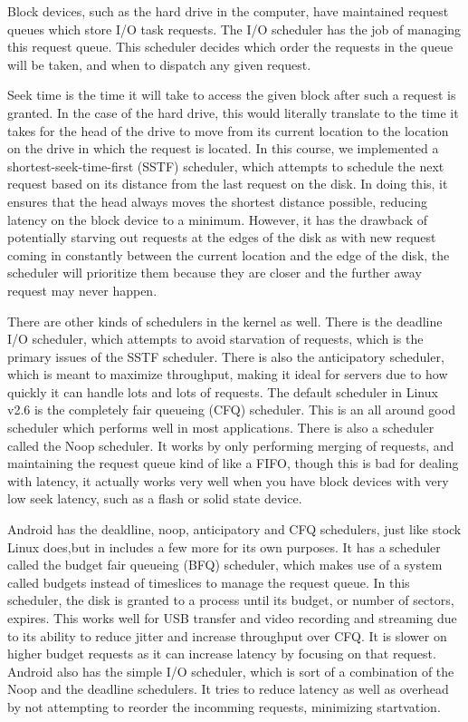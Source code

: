 \documentclass[a4paper]{article}
\begin{document}
Block devices, such as the hard drive in the computer, have maintained request queues which store I/O task requests. The I/O scheduler has the job of managing this request queue. This scheduler decides which order the requests in the queue will be taken, and when to dispatch any given request. 

Seek time is the time it will take to access the given block after such a request is granted. In the case of the hard drive, this would literally translate to the time it takes for the head of the drive to move from its current location to the location on the drive in which the request is located. In this course, we implemented a shortest-seek-time-first (SSTF) scheduler, which attempts to schedule the next request based on its distance from the last request on the disk. In doing this, it ensures that the head always moves the shortest distance possible, reducing latency on the block device to a minimum. However, it has the drawback of potentially starving out requests at the edges of the disk as with new request coming in constantly between the current location and the edge of the disk, the scheduler will prioritize them because they are closer and the further away request may never happen. 

There are other kinds of schedulers in the kernel as well. There is the deadline I/O scheduler, which attempts to avoid starvation of requests, which is the primary issues of the SSTF scheduler. There is also the anticipatory scheduler, which is meant to maximize throughput, making it ideal for servers due to how quickly it can handle lots and lots of requests. The default scheduler in Linux v2.6 is the completely fair queueing (CFQ) scheduler. This is an all around good scheduler which performs well in most applications. There is also a scheduler called the Noop scheduler. It works by only performing merging of requests, and maintaining the request queue kind of like a FIFO, though this is bad for dealing with latency, it actually works very well when you have block devices with very low seek latency, such as a flash or solid state device.

Android has the dealdline, noop, anticipatory and CFQ schedulers, just like stock Linux does,but in includes a few more for its own purposes. It has a scheduler called the budget fair queueing (BFQ) scheduler, which makes use of a system called budgets instead of timeslices to manage the request queue. In this scheduler, the disk is granted to a process until its budget, or number of sectors, expires. This works well for USB transfer and video recording and streaming due to its ability to reduce jitter and increase throughput over CFQ. It is slower on higher budget requests as it can increase latency by focusing on that request. Android also has the simple I/O scheduler, which is sort of a combination of the Noop and the deadline schedulers. It tries to reduce latency as well as overhead by not attempting to reorder the incomming requests, minimizing startvation.
\end{document}
